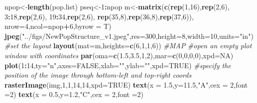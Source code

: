 \documentclass[]{article}
\newenvironment{Shaded}{\begin{snugshade}}{\end{snugshade}}
\newcommand{\KeywordTok}[1]{\textcolor[rgb]{0.13,0.29,0.53}{\textbf{#1}}}
\newcommand{\DataTypeTok}[1]{\textcolor[rgb]{0.13,0.29,0.53}{#1}}
\newcommand{\DecValTok}[1]{\textcolor[rgb]{0.00,0.00,0.81}{#1}}
\newcommand{\FloatTok}[1]{\textcolor[rgb]{0.00,0.00,0.81}{#1}}
\newcommand{\StringTok}[1]{\textcolor[rgb]{0.31,0.60,0.02}{#1}}
\newcommand{\CommentTok}[1]{\textcolor[rgb]{0.56,0.35,0.01}{\textit{#1}}}
\newcommand{\OtherTok}[1]{\textcolor[rgb]{0.56,0.35,0.01}{#1}}
\newcommand{\OperatorTok}[1]{\textcolor[rgb]{0.81,0.36,0.00}{\textbf{#1}}}
\newcommand{\NormalTok}[1]{#1}
\begin{document}
\begin{Shaded}
\begin{Highlighting}[]
\NormalTok{npop<-}\KeywordTok{length}\NormalTok{(pop.list)}
\NormalTok{pseq<-}\DecValTok{1}\OperatorTok{:}\NormalTok{npop}
\NormalTok{m<-}\KeywordTok{matrix}\NormalTok{(}\KeywordTok{c}\NormalTok{(}\KeywordTok{rep}\NormalTok{(}\DecValTok{1}\NormalTok{,}\DecValTok{16}\NormalTok{),}\KeywordTok{rep}\NormalTok{(}\DecValTok{2}\NormalTok{,}\DecValTok{6}\NormalTok{),}
            \DecValTok{3}\OperatorTok{:}\DecValTok{18}\NormalTok{,}\KeywordTok{rep}\NormalTok{(}\DecValTok{2}\NormalTok{,}\DecValTok{6}\NormalTok{),}
            \DecValTok{19}\OperatorTok{:}\DecValTok{34}\NormalTok{,}\KeywordTok{rep}\NormalTok{(}\DecValTok{2}\NormalTok{,}\DecValTok{6}\NormalTok{),}
            \KeywordTok{rep}\NormalTok{(}\DecValTok{35}\NormalTok{,}\DecValTok{8}\NormalTok{),}\KeywordTok{rep}\NormalTok{(}\DecValTok{36}\NormalTok{,}\DecValTok{8}\NormalTok{),}\KeywordTok{rep}\NormalTok{(}\DecValTok{37}\NormalTok{,}\DecValTok{6}\NormalTok{)),}
          \DataTypeTok{nrow=}\DecValTok{4}\NormalTok{,}\DataTypeTok{ncol=}\NormalTok{npop}\OperatorTok{+}\DecValTok{6}\NormalTok{,}\DataTypeTok{byrow =}\NormalTok{ T)}
\KeywordTok{jpeg}\NormalTok{(}\StringTok{"../figs/NewPopStructure_v1.jpeg"}\NormalTok{,}\DataTypeTok{res=}\DecValTok{300}\NormalTok{,}\DataTypeTok{height=}\DecValTok{8}\NormalTok{,}\DataTypeTok{width=}\DecValTok{10}\NormalTok{,}\DataTypeTok{units=}\StringTok{"in"}\NormalTok{)}
\CommentTok{#set the layout}
\KeywordTok{layout}\NormalTok{(}\DataTypeTok{mat=}\NormalTok{m,}\DataTypeTok{heights=}\KeywordTok{c}\NormalTok{(}\DecValTok{6}\NormalTok{,}\DecValTok{1}\NormalTok{,}\DecValTok{1}\NormalTok{,}\DecValTok{6}\NormalTok{))}
\CommentTok{#MAP}
\CommentTok{#open an empty plot window with coordinates}
\KeywordTok{par}\NormalTok{(}\DataTypeTok{oma=}\KeywordTok{c}\NormalTok{(}\FloatTok{1.5}\NormalTok{,}\FloatTok{3.5}\NormalTok{,}\DecValTok{1}\NormalTok{,}\DecValTok{2}\NormalTok{),}\DataTypeTok{mar=}\KeywordTok{c}\NormalTok{(}\DecValTok{0}\NormalTok{,}\DecValTok{0}\NormalTok{,}\DecValTok{0}\NormalTok{,}\DecValTok{0}\NormalTok{),}\DataTypeTok{xpd=}\OtherTok{NA}\NormalTok{)}
\KeywordTok{plot}\NormalTok{(}\DecValTok{1}\OperatorTok{:}\DecValTok{14}\NormalTok{,}\DataTypeTok{ty=}\StringTok{"n"}\NormalTok{,}\DataTypeTok{axes=}\OtherTok{FALSE}\NormalTok{,}\DataTypeTok{xlab=}\StringTok{""}\NormalTok{,}\DataTypeTok{ylab=}\StringTok{""}\NormalTok{,}\DataTypeTok{xpd=}\OtherTok{TRUE}\NormalTok{)}
\CommentTok{#specify the position of the image through bottom-left and top-right coords}
\KeywordTok{rasterImage}\NormalTok{(img,}\DecValTok{1}\NormalTok{,}\DecValTok{1}\NormalTok{,}\DecValTok{14}\NormalTok{,}\DecValTok{14}\NormalTok{,}\DataTypeTok{xpd=}\OtherTok{TRUE}\NormalTok{)}
\KeywordTok{text}\NormalTok{(}\DataTypeTok{x =} \FloatTok{1.5}\NormalTok{,}\DataTypeTok{y=}\FloatTok{11.5}\NormalTok{,}\StringTok{"A"}\NormalTok{,}\DataTypeTok{cex =} \DecValTok{2}\NormalTok{,}\DataTypeTok{font =}\DecValTok{2}\NormalTok{)}
\KeywordTok{text}\NormalTok{(}\DataTypeTok{x =} \FloatTok{0.5}\NormalTok{,}\DataTypeTok{y=}\FloatTok{1.2}\NormalTok{,}\StringTok{"C"}\NormalTok{,}\DataTypeTok{cex =} \DecValTok{2}\NormalTok{,}\DataTypeTok{font =}\DecValTok{2}\NormalTok{)}


\end{Highlighting}
\end{Shaded}
\end{document}
